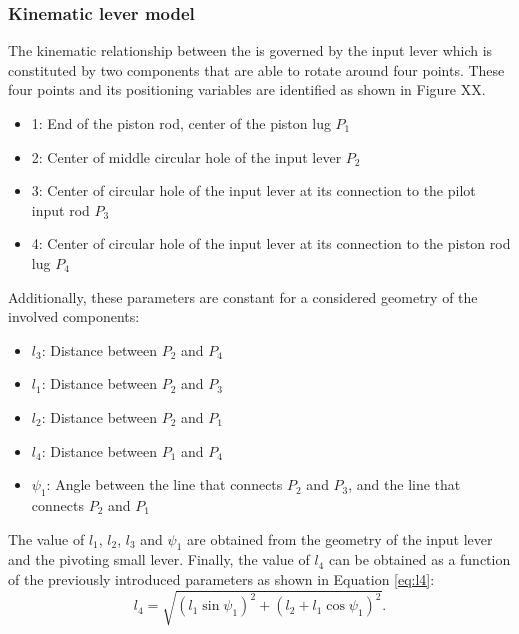   \clearpage
  \subsubsection{Kinematic lever model}

    The kinematic relationship between the is governed by the input lever which is constituted by two components that are able to rotate around four points. These four points and its positioning variables are identified as shown in Figure XX.
    \begin{itemize}
      \item 1: End of the piston rod, center of the piston lug $P_1$
      \item 2: Center of middle circular hole of the input lever $P_2$
      \item 3: Center of circular hole of the input lever at its connection to the pilot input rod $P_3$
      \item 4: Center of circular hole of the input lever at its connection to the piston rod lug $P_4$
    \end{itemize}
    Additionally, these parameters are constant for a considered geometry of the involved components:
    \begin{itemize}
      \item $l_3$: Distance between $P_2$ and $P_4$
      \item $l_1$: Distance between $P_2$ and $P_3$
      \item $l_2$: Distance between $P_2$ and $P_1$
      \item $l_4$: Distance between $P_1$ and $P_4$
      \item $\psi_1$: Angle between the line that connects $P_2$ and $P_3$, and the line that connects $P_2$ and $P_1$
    \end{itemize}

    The value of $l_1$, $l_2$, $l_3$ and $\psi_1$ are obtained from the geometry of the input lever and the pivoting small lever. Finally, the value of $l_4$ can be obtained as a function of the previously introduced parameters as shown in Equation \ref{eq:l4}:
    \begin{equation}\label{eq:l4}
      l_4 = \sqrt{ (l_1 \sin\psi_1)^2 + (l_2 + l_1 \cos\psi_1)^2 }.
    \end{equation}


